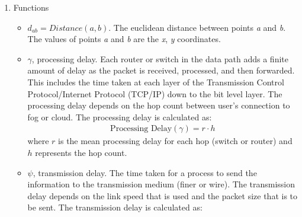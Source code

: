 \documentclass[10pt,journal,compsoc]{IEEEtran}
\begin{document}
\begin{enumerate}

\item Functions
\begin{itemize}
\item $d_{ab} = Distance (\textit{a}, \textit{b})$. The euclidean distance between points \textit{a} and \textit{b}. The values of points \textit{a} and \textit{b} are the \textit{x}, \textit{y} coordinates.
\item $\gamma$, processing delay. Each router or switch in the data path adds a finite amount of delay as the packet is received, processed, and then forwarded. This includes the time taken at each layer of the Transmission Control Protocol/Internet Protocol (TCP/IP) down to the bit level layer. The processing delay depends on the hop count between user's connection to fog or cloud. The processing delay is calculated as: 
\begin{align}
\text{Processing Delay} (\gamma) = 
r \cdot h
\end{align}
where $r$ is the mean processing delay for each hop (switch or router) and $h$ represents the hop count.
\item $\psi$, transmission delay. The time taken for a process to send the information to the transmission medium (finer or wire). The transmission delay depends on the link speed that is used and the packet size that is to be sent. The transmission delay is calculated as: 

\end{itemize}
\end{enumerate}
\end{document}
